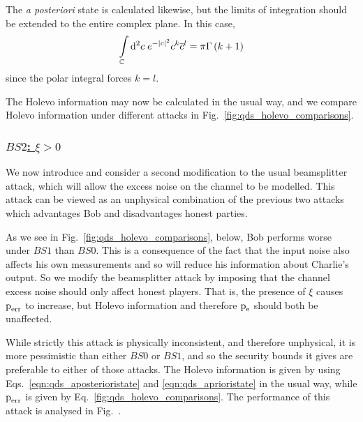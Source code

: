 The \emph{a posteriori} state is calculated likewise, but the limits of integration should be extended to the entire complex plane. In this case,
\begin{equation}\label{eqn:qds_bs1_deriv_4}
\int\limits_{\mathbb{C}} \mathop{}\!\mathrm{d^2} c \; e^{-\left|c\right|^2}c^k \overline{c}^l = \pi \Gamma\left(k+1\right)
\end{equation}
since the polar integral forces $k=l$.




The Holevo information may now be calculated in the usual way, and we compare Holevo information under different attacks in Fig.~\ref{fig:qds_holevo_comparisons}.

\subsubsection{\underline{$BS2$: $\xi > 0$}}
We now introduce and consider a second modification to the usual beamsplitter attack, which will allow the excess noise on the channel to be modelled. This attack can be viewed as an unphysical combination of the previous two attacks which advantages Bob and disadvantages honest parties.

As we see in Fig.~\ref{fig:qds_holevo_comparisons}, below, Bob performs worse under $BS1$ than $BS0$. This is a consequence of the fact that the input noise also affects his own measurements and so will reduce his information about Charlie's output. So we modify the beamsplitter attack by imposing that the channel excess noise should only affect honest players. That is, the presence of $\xi$ causes $\text{p}_{\text{err}}$ to increase, but Holevo information and therefore $\text{p}_{\text{e}}$ should both be unaffected. 

While strictly this attack is physically inconsistent, and therefore unphysical, it is more pessimistic than either $BS0$ or $BS1$, and so the security bounds it gives are preferable to either of those attacks. The Holevo information is given by using Eqs.~\ref{eqn:qds_aposterioristate} and \ref{eqn:qds_aprioristate} in the usual way, while $\text{p}_{\text{err}}$ is given by Eq.~\ref{fig:qds_holevo_comparisons}. The performance of this attack is analysed in Fig.~.

